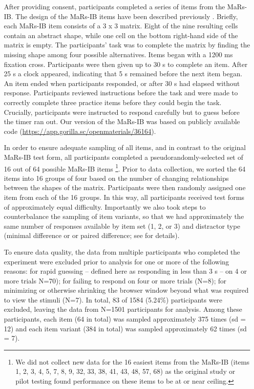 \documentclass[a4paper,man,natbib]{apa6}
\begin{document}
After providing consent, participants completed a series of items from the MaRs-IB. The design of the MaRs-IB items have been described previously \citep{chierchia2019matrix}. Briefly, each MaRs-IB item consists of a 3 x 3 matrix. Eight of the nine resulting cells contain an abstract shape, while one cell on the bottom right-hand side of the matrix is empty. The participants' task was to complete the matrix by finding the missing shape among four possible alternatives. Items began with a 1200 ms fixation cross. Participants were then given up to 30 s to complete an item. After 25 s a clock appeared, indicating that 5 s remained before the next item began. An item ended when participants responded, or after 30 s had elapsed without response. Participants reviewed instructions before the task and were made to correctly complete three practice items before they could begin the task. Crucially, participants were instructed to respond carefully but to guess before the timer ran out. Our version of the MaRs-IB was based on publicly available code (\url{https://app.gorilla.sc/openmaterials/36164}).

In order to ensure adequate sampling of all items, and in contrast to the original MaRs-IB test form, all participants completed a pseudorandomly-selected set of 16 out of 64 possible MaRs-IB items \footnote{We did not collect new data for the 16 easiest items from the MaRs-IB (items 1, 2, 3, 4, 5, 7, 8, 9, 32, 33, 38, 41, 43, 48, 57, 68) as the original study or pilot testing found performance on these items to be at or near ceiling.}. Prior to data collection, we sorted the 64 items into 16 groups of four based on the number of changing relationships between the shapes of the matrix. Participants were then randomly assigned one item from each of the 16 groups. In this way, all participants received test forms of approximately equal difficulty. Importantly we also took steps to counterbalance the sampling of item variants, so that we had approximately the same number of responses available by item set (1, 2, or 3) and distractor type (minimal difference or or paired difference; see \cite{chierchia2019matrix} for details). 

To ensure data quality, the data from multiple participants who completed the experiment were excluded prior to analysis for one or more of the following reasons: for rapid guessing -- defined here as responding in less than 3 s -- on 4 or more trials N=70); for failing to respond on four or more trials (N=8); for minimizing or otherwise shrinking the browser window beyond what was required to view the stimuli (N=7). In total, 83 of 1584 (5.24\%) participants were excluded, leaving the data from N=1501 participants for analysis. Among these participants, each item (64 in total) was sampled approximately 375 times (sd = 12) and each item variant (384 in total) was sampled approximately 62 times (sd = 7). 
\end{document}
